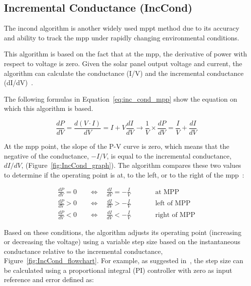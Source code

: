     \subsection{Incremental Conductance (IncCond)}
        The \ac{incond} algorithm is another widely used \ac{mppt} method due to its accuracy and ability to track the \ac{mpp} under rapidly changing environmental conditions.
        
        This algorithm is based on the fact that at the \ac{mpp}, the derivative of power with respect to voltage is zero. Given the solar panel output voltage and current, the algorithm can calculate the conductance (I/V) and the incremental conductance (dI/dV)~\cite{Intelligent_PV_Module_2006}. 
        
        The following formulas in Equation~\ref{eq:inc_cond_mpp} show the equation on which this algorithm is based. 

        \begin{equation}
            \frac{dP}{dV} = \frac{d(V \cdot I)}{dV} = I + V \frac{dI}{dV} \rightarrow \frac{1}{V} \times \frac{dP}{dV} = \frac{I}{V} + \frac{dI}{dV}
            \label{eq:inc_cond_mpp}
        \end{equation}

        At the \ac{mpp} point, the slope of the P-V curve is zero, which means that the negative of the conductance, $-I / V$, is equal to the incremental conductance, $dI / dV$, (Figure~\ref{fig:IncCond_graph}). The algorithm compares these two values to determine if the operating point is at, to the left, or to the right of the \ac{mpp}~\cite{MPPT_Comparison_techniques}\cite{Comparison_PV_Array_MPPT_Techniques_2007}:

        \begin{equation}
            \begin{aligned}
            \frac{dP}{dV}=0 \quad&\Longleftrightarrow\quad \frac{dI}{dV}=-\frac{I}{V}
            \qquad &&\text{at MPP} \\[4pt]
            \frac{dP}{dV}>0 \quad&\Longleftrightarrow\quad \frac{dI}{dV}>-\frac{I}{V}
            \qquad &&\text{left of MPP} \\[4pt]
            \frac{dP}{dV}<0 \quad&\Longleftrightarrow\quad \frac{dI}{dV}<-\frac{I}{V}
            \qquad &&\text{right of MPP}
            \end{aligned}
            \label{eq:inc_cond}
        \end{equation}


        Based on these conditions, the algorithm adjusts its operating point (increasing or decreasing the voltage) using a variable step size based on the instantaneous conductance relative to the incremental conductance, Figure~\ref{fig:IncCond_flowchart}. For example, as suggested in~\cite{Comparison_PV_Array_MPPT_Techniques_2007}, the step size can be calculated using a proportional integral (PI) controller with zero as input reference and error defined as:

